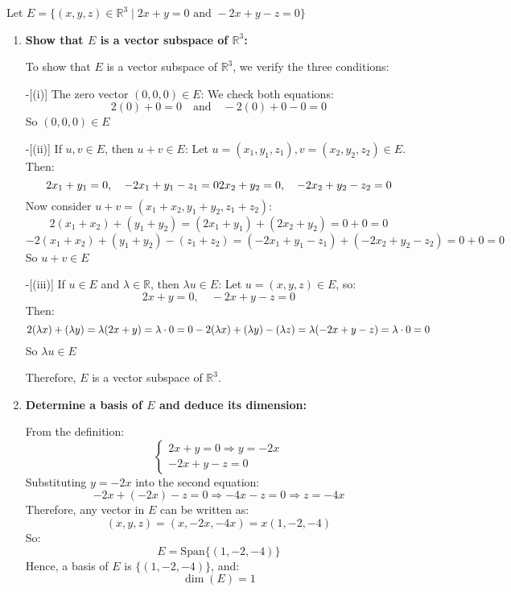 \documentclass[12pt]{article}
\begin{document}
\begin{answerbox}
Let $ E = \{(x, y, z) \in \mathbb{R}^3 \mid 2x + y = 0 \text{ and } -2x + y - z = 0 \} $

\begin{enumerate}
    \item \textbf{Show that $ E $ is a vector subspace of $ \mathbb{R}^3 $:}
    
    To show that $ E $ is a vector subspace of $ \mathbb{R}^3 $, we verify the three conditions:
    
        
-[(i)] The zero vector $ (0, 0, 0) \in E $:  
        We check both equations:
        $$
        2(0) + 0 = 0 \quad \text{and} \quad -2(0) + 0 - 0 = 0
        $$
        So $ (0, 0, 0) \in E $
        
        
-[(ii)] If $ u, v \in E $, then $ u + v \in E $:  
        Let $ u = (x_1, y_1, z_1), v = (x_2, y_2, z_2) \in E $. Then:
        $$
        2x_1 + y_1 = 0, \quad -2x_1 + y_1 - z_1 = 0 \\
        2x_2 + y_2 = 0, \quad -2x_2 + y_2 - z_2 = 0
        $$
        Now consider $ u + v = (x_1 + x_2, y_1 + y_2, z_1 + z_2) $:
        $$
        2(x_1 + x_2) + (y_1 + y_2) = (2x_1 + y_1) + (2x_2 + y_2) = 0 + 0 = 0
        $$
        $$
        -2(x_1 + x_2) + (y_1 + y_2) - (z_1 + z_2) = (-2x_1 + y_1 - z_1) + (-2x_2 + y_2 - z_2) = 0 + 0 = 0
        $$
        So $ u + v \in E $
        
        
-[(iii)] If $ u \in E $ and $ \lambda \in \mathbb{R} $, then $ \lambda u \in E $:  
        Let $ u = (x, y, z) \in E $, so:
        $$
        2x + y = 0, \quad -2x + y - z = 0
        $$
        Then:
        $$
        2(\lambda x) + (\lambda y) = \lambda(2x + y) = \lambda \cdot 0 = 0 \\
        -2(\lambda x) + (\lambda y) - (\lambda z) = \lambda(-2x + y - z) = \lambda \cdot 0 = 0
        $$
        So $ \lambda u \in E $
    
    Therefore, $ E $ is a vector subspace of $ \mathbb{R}^3 $.
    
    \item \textbf{Determine a basis of $ E $ and deduce its dimension:}
    
    From the definition:
    $$
    \begin{cases}
    2x + y = 0 \Rightarrow y = -2x \\
    -2x + y - z = 0
    \end{cases}
    $$
    Substituting $ y = -2x $ into the second equation:
    $$
    -2x + (-2x) - z = 0 \Rightarrow -4x - z = 0 \Rightarrow z = -4x
    $$
    Therefore, any vector in $ E $ can be written as:
    $$
    (x, y, z) = (x, -2x, -4x) = x(1, -2, -4)
    $$
    So:
    $$
    E = \text{Span}\{(1, -2, -4)\}
    $$
    Hence, a basis of $ E $ is $ \{(1, -2, -4)\} $, and:
    $$
    \dim(E) = 1
    $$


\end{enumerate}
\end{answerbox}
\end{document}
